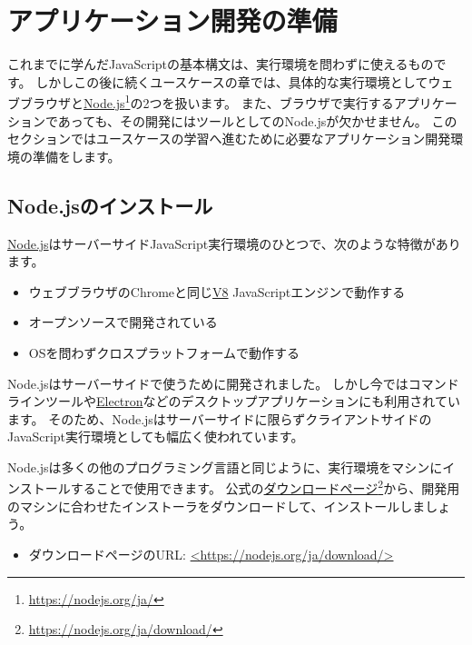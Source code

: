\hypertarget{setup-local-env}{%
\chapter{アプリケーション開発の準備}\label{setup-local-env}}
\thispagestyle{frontheadings}

これまでに学んだJavaScriptの基本構文は、実行環境を問わずに使えるものです。
しかしこの後に続くユースケースの章では、具体的な実行環境としてウェブブラウザと\href{https://nodejs.org/ja/}{Node.js}\footnote{\url{https://nodejs.org/ja/}}の2つを扱います。
また、ブラウザで実行するアプリケーションであっても、その開発にはツールとしてのNode.jsが欠かせません。
このセクションではユースケースの学習へ進むために必要なアプリケーション開発環境の準備をします。

\hypertarget{install-nodejs}{%
\section{Node.jsのインストール}\label{install-nodejs}}

\href{https://nodejs.org/ja/}{Node.js}はサーバーサイドJavaScript実行環境のひとつで、次のような特徴があります。

\begin{itemize}
\item
  ウェブブラウザのChromeと同じ\href{https://v8.dev/}{V8}
  JavaScriptエンジンで動作する
\item
  オープンソースで開発されている
\item
  OSを問わずクロスプラットフォームで動作する
\end{itemize}

Node.jsはサーバーサイドで使うために開発されました。
しかし今ではコマンドラインツールや\href{https://www.electronjs.org/}{Electron}などのデスクトップアプリケーションにも利用されています。
そのため、Node.jsはサーバーサイドに限らずクライアントサイドのJavaScript実行環境としても幅広く使われています。

Node.jsは多くの他のプログラミング言語と同じように、実行環境をマシンにインストールすることで使用できます。
公式の\href{https://nodejs.org/ja/download/}{ダウンロードページ}\footnote{\url{https://nodejs.org/ja/download/}}から、開発用のマシンに合わせたインストーラをダウンロードして、インストールしましょう。

\begin{itemize}
\item ダウンロードページのURL: \href{https://nodejs.org/ja/download/}{<https://nodejs.org/ja/download/>}
\end{itemize}

